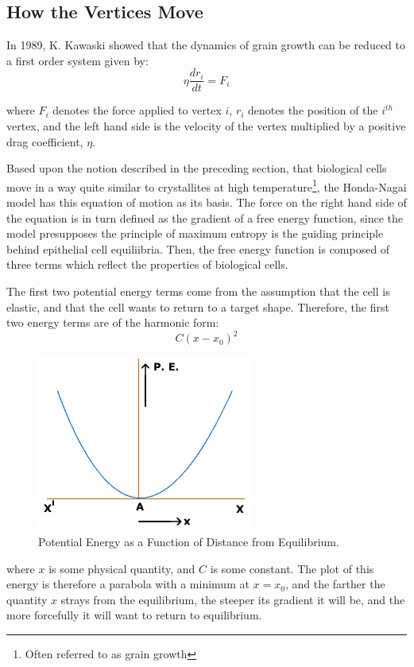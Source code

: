 \subsection{How the Vertices Move}
In 1989, K. Kawaski showed that the dynamics of grain growth can be reduced to a first order system given by:
\begin{equation}
\eta\frac{dr_i}{dt} = F_i
\end{equation}

where $F_i$ denotes the force applied to vertex $i$, $r_i$ denotes the position of the $i^{th}$ vertex,  and the left hand side is the velocity of the vertex multiplied by a positive drag coefficient, $\eta$\cite{1989 Kawasaki}.

Based upon the notion described in the preceding section, that biological cells move in a way quite similar to crystallites at high temperature\footnote{Often referred to as grain growth}, the Honda-Nagai model has this equation of motion as its basis. The force on the right hand side of the equation is in turn defined as the gradient of a free energy function, since the model presupposes the principle of maximum entropy is the guiding principle behind epithelial cell equiliibria. Then, the free energy function is composed of three terms which reflect the properties of biological cells.

The first two potential energy terms come from the assumption that the cell is elastic, and that the cell wants to return to a target shape. Therefore, the first two energy terms are of the harmonic form: 
\begin{equation}
C(x-x_0)^2
\end{equation}
\begin{figure}
\centering
\includegraphics{../diagrams/pe.jpg}
\caption{Potential Energy as a Function of Distance from Equilibrium.}
\label{fig:pe}
\end{figure}
where $x$ is some physical quantity, and $C$ is some constant. The plot of this energy is therefore a parabola with a minimum at $x =  x_0$, and the farther the quantity $x$ strays from the equilibrium, the steeper its gradient it will be, and the more forcefully it will want to return to equilibrium. 

